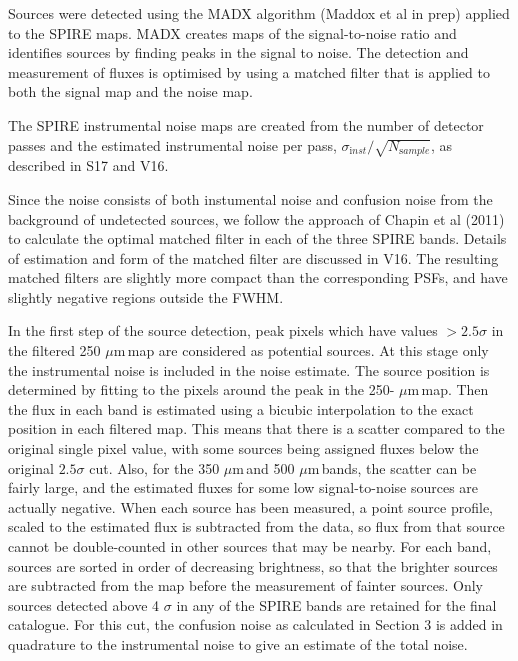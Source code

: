 \documentclass[useAMS,usenatbib]{mn2e}
\def\mic{ $\mu $m\,}
\begin{document}
Sources were detected using the MADX algorithm (Maddox et al in prep)
applied to the SPIRE maps.  MADX creates maps of the signal-to-noise
ratio and identifies sources by finding peaks in the signal to noise. The
detection and measurement of fluxes is optimised by using a matched
filter that is applied to both the signal map and the noise map. 

The SPIRE instrumental noise maps are created from the number of
detector passes and the estimated instrumental noise per pass,
$\sigma_{\mathrm inst} /\sqrt{N_ {\mathrm sample}}$, as described in S17 and V16.

 
Since the noise consists of both instumental noise and
confusion noise from the background of undetected sources, we follow
the approach of Chapin et al (2011) to calculate the optimal matched
filter in each of the three SPIRE bands. Details of estimation and
form of the matched filter are discussed in V16.  The resulting
matched filters are slightly more compact than the corresponding PSFs,
and have slightly negative regions outside the FWHM.  

In the first step of the source detection, peak pixels which have
values $>2.5\sigma$ in the filtered 250\mic map are considered as
potential sources. At this stage only the instrumental noise is
included in the noise estimate. The source position is determined by
fitting to the pixels around the peak in the 250-\mic map. Then the
flux in each band is estimated using a bicubic interpolation to the
exact position in each filtered map. This means that there is a
scatter compared to the original single pixel value, with some sources
being assigned fluxes below the original $2.5\sigma$ cut. Also, for
the 350\mic and 500\mic bands, the scatter can be fairly large, and
the estimated fluxes for some low signal-to-noise sources are actually
negative.  When each source has been measured, a point source profile,
scaled to the estimated flux is subtracted from the data, so flux from
that source cannot be double-counted in other sources that may be
nearby. For each band, sources are sorted in order of decreasing
brightness, so that the brighter sources are subtracted from the map
before the measurement of fainter sources.  Only sources detected
above 4 $\sigma$ in any of the SPIRE bands are retained for the final
catalogue. For this cut, the confusion noise as calculated in Section
3 is added in quadrature to the instrumental noise to give an estimate
of the total noise.
\end{document}
